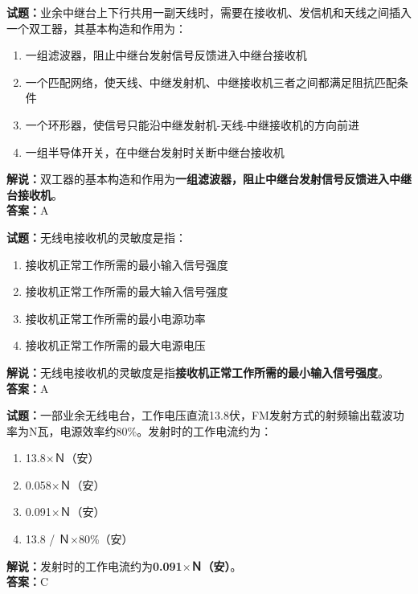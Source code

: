 \documentclass{ctexbook}
\begin{document}
\vspace{1em}

\textbf{试题：}业余中继台上下行共用一副天线时，需要在接收机、发信机和天线之间插入一个双工器，其基本构造和作用为：
\begin{enumerate}[leftmargin=3em]
  \item 一组滤波器，阻止中继台发射信号反馈进入中继台接收机
  \item 一个匹配网络，使天线、中继发射机、中继接收机三者之间都满足阻抗匹配条件
  \item 一个环形器，使信号只能沿中继发射机-天线-中继接收机的方向前进
  \item 一组半导体开关，在中继台发射时关断中继台接收机
\end{enumerate}
\noindent\textbf{解说：}双工器的基本构造和作用为\textbf{一组滤波器，阻止中继台发射信号反馈进入中继台接收机}。\\\noindent\textbf{答案：}A

\vspace{1em}

\textbf{试题：}无线电接收机的灵敏度是指：
\begin{enumerate}[leftmargin=3em]
  \item 接收机正常工作所需的最小输入信号强度
  \item 接收机正常工作所需的最大输入信号强度
  \item 接收机正常工作所需的最小电源功率
  \item 接收机正常工作所需的最大电源电压
\end{enumerate}
\noindent\textbf{解说：}无线电接收机的灵敏度是指\textbf{接收机正常工作所需的最小输入信号强度}。\\\noindent\textbf{答案：}A

\vspace{1em}

\textbf{试题：}一部业余无线电台，工作电压直流13.8伏，FM发射方式的射频输出载波功率为N瓦，电源效率约80\%。发射时的工作电流约为：
\begin{enumerate}[leftmargin=3em]
  \item 13.8$\times$Ｎ（安）
  \item 0.058$\times$Ｎ（安）
  \item 0.091$\times$Ｎ（安）
  \item 13.8 / Ｎ$\times$80\%（安）%
\end{enumerate}
\noindent\textbf{解说：}发射时的工作电流约为\textbf{0.091$\times$Ｎ（安）}。\\\noindent\textbf{答案：}C
\end{document}
